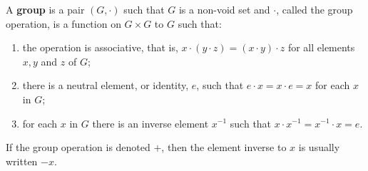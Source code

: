 A \textbf{group} is a pair $(G, \cdot)$ such that $G$ is a non-void set and $\cdot$, called the group operation, is a function on $G \times G$ to $G$ such that:
\begin{enumerate}
\item[(a)] the operation is associative, that is, $x \cdot (y \cdot z) = (x \cdot y) \cdot z$ for all elements $x, y$ and $z$ of $G$;
\item[(b)] there is a neutral element, or identity, $e$, such that $e \cdot x = x \cdot e = x$ for each $x$ in $G$;
\item[(c)] for each $x$ in $G$ there is an inverse element $x^{-1}$ such that $x \cdot x^{-1} = x^{-1} \cdot x = e$.
\end{enumerate}
If the group operation is denoted $+$, then the element inverse to $x$ is usually written $-x$.
